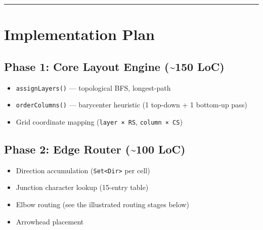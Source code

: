 \begin{center}\rule{0.5\linewidth}{0.5pt}\end{center}

\section{Implementation Plan}\label{record-426-implementation-plan}

\subsection{Phase 1: Core Layout Engine (\textasciitilde150 LoC)}\label{record-426-phase-1-core-layout-engine-150-loc}

\begin{itemize}
\tightlist
\item
  \texttt{a\allowbreak{}s\allowbreak{}s\allowbreak{}i\allowbreak{}g\allowbreak{}n\allowbreak{}L\allowbreak{}a\allowbreak{}y\allowbreak{}e\allowbreak{}r\allowbreak{}s\allowbreak{}(\allowbreak{})} --- topological BFS, longest-path
\item
  \texttt{o\allowbreak{}r\allowbreak{}d\allowbreak{}e\allowbreak{}r\allowbreak{}C\allowbreak{}o\allowbreak{}l\allowbreak{}u\allowbreak{}m\allowbreak{}n\allowbreak{}s\allowbreak{}(\allowbreak{})} --- barycenter heuristic (1 top-down + 1 bottom-up pass)
\item
  Grid coordinate mapping (\texttt{l\allowbreak{}a\allowbreak{}y\allowbreak{}e\allowbreak{}r\allowbreak{} \allowbreak{}×\allowbreak{} \allowbreak{}R\allowbreak{}S}, \texttt{c\allowbreak{}o\allowbreak{}l\allowbreak{}u\allowbreak{}m\allowbreak{}n\allowbreak{} \allowbreak{}×\allowbreak{} \allowbreak{}C\allowbreak{}S})
\end{itemize}

\subsection{Phase 2: Edge Router (\textasciitilde100 LoC)}\label{record-426-phase-2-edge-router-100-loc}

\begin{itemize}
\tightlist
\item
  Direction accumulation (\texttt{S\allowbreak{}e\allowbreak{}t\allowbreak{}<\allowbreak{}D\allowbreak{}i\allowbreak{}r\allowbreak{}>} per cell)
\item
  Junction character lookup (15-entry table)
\item
  Elbow routing (see the illustrated routing stages below)
\item
  Arrowhead placement
\end{itemize}


